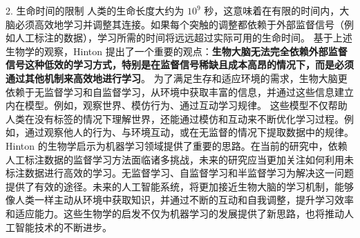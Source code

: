 2. 生命时间的限制
人类的生命长度大约为 $10^9$ 秒，这意味着在有限的时间内，大脑必须高效地学习并调整其连接。如果每个突触的调整都依赖于外部监督信号（例如人工标注的数据），学习所需的时间将远远超过实际可用的生命时间。
基于上述生物学的观察，Hinton 提出了一个重要的观点：{\bf 生物大脑无法完全依赖外部监督信号这种低效的学习方式，特别是在监督信号稀缺且成本高昂的情况下，而是必须通过其他机制来高效地进行学习}。
为了满足生存和适应环境的需求，生物大脑更依赖于无监督学习和自监督学习，从环境中获取丰富的信息，并通过这些信息建立内在模型。例如，观察世界、模仿行为、通过互动学习规律。
这些模型不仅帮助人类在没有标签的情况下理解世界，还能通过模仿和互动来不断优化学习过程。例如，通过观察他人的行为、与环境互动，或在无监督的情况下提取数据中的规律。
Hinton 的生物学启示为机器学习领域提供了重要的思路。在当前的研究中，依赖人工标注数据的监督学习方法面临诸多挑战，未来的研究应当更加关注如何利用未标注数据进行高效的学习。无监督学习、自监督学习和半监督学习为解决这一问题提供了有效的途径。未来的人工智能系统，将更加接近生物大脑的学习机制，能够像人类一样主动从环境中获取知识，并通过不断的互动和自我调整，提升学习效率和适应能力。这些生物学的启发不仅为机器学习的发展提供了新思路，也将推动人工智能技术的不断进步。
%
%
%
%
%
%
%


\nocite{*}
\newpage
